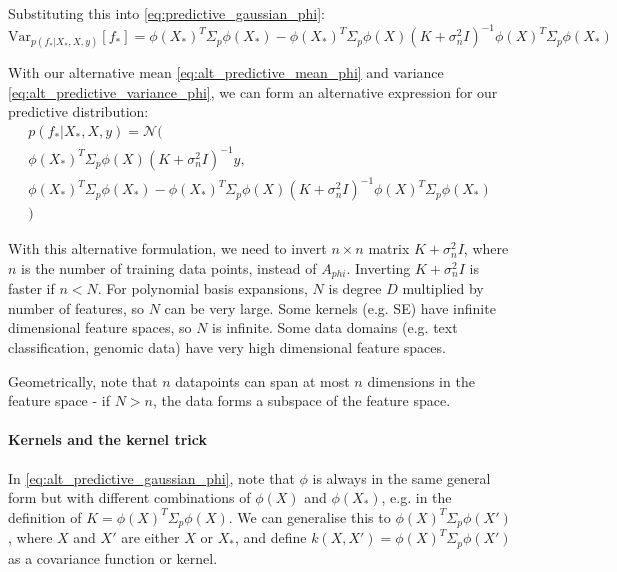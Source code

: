 \documentclass[10pt]{article}
\begin{document}
 Substituting this into \ref{eq:predictive_gaussian_phi}:
\begin{equation} \label{eq:alt_predictive_variance_phi}
    \text{Var}_{p(f_*|X_*,X,y)}[f_*] = \phi(X_*)^T\Sigma_p\phi(X_*) - \phi(X_*)^T\Sigma_p\phi(X)(K+\sigma_n^2I)^{-1}\phi(X)^T\Sigma_p\phi(X_*)
\end{equation}

With our alternative mean \ref{eq:alt_predictive_mean_phi} and variance \ref{eq:alt_predictive_variance_phi}, we can form an alternative expression for our predictive distribution:
\begin{equation} \label{eq:alt_predictive_gaussian_phi}
    \begin{aligned}
        p(f_*|X_*,X,y) = \mathcal{N}( \\
        \phi(X_*)^T\Sigma_p\phi(X)(K+\sigma_n^2I)^{-1}y , \\
        \phi(X_*)^T\Sigma_p\phi(X_*) - \phi(X_*)^T\Sigma_p\phi(X)(K+\sigma_n^2I)^{-1}\phi(X)^T\Sigma_p\phi(X_*) \\
        )
    \end{aligned}
\end{equation}

With this alternative formulation, we need to invert $n \times n$ matrix $K + \sigma_n^2I$, where $n$ is the number of training data points, instead of $A_{phi}$. Inverting $K + \sigma_n^2I$ is faster if $n < N$. For polynomial basis expansions, $N$ is degree $D$ multiplied by number of features, so $N$ can be very large. Some kernels (e.g. SE) have infinite dimensional feature spaces, so $N$ is infinite. Some data domains (e.g. text classification, genomic data) have very high dimensional feature spaces. 

Geometrically, note that $n$ datapoints can span at most $n$ dimensions in the feature space - if $N > n$, the data forms a subspace of the feature space.

\paragraph{Kernels and the kernel trick}
In \ref{eq:alt_predictive_gaussian_phi}, note that $\phi$ is always in the same general form but with different combinations of $\phi(X)$ and $\phi(X_*)$, e.g. in the definition of $K = \phi(X)^T\Sigma_p\phi(X)$. We can generalise this to $\phi(X)^T\Sigma_p\phi(X')$, where $X$ and $X'$ are either $X$ or $X_*$, and define $k(X,X') = \phi(X)^T\Sigma_p\phi(X')$ as a covariance function or kernel. 
\end{document}
